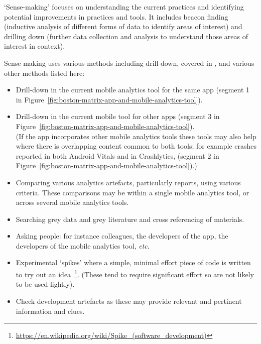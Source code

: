 `Sense-making' focuses on understanding the current practices and identifying potential improvements in practices and tools.  It includes beacon finding (inductive analysis of different forms of data to identify areas of interest) and drilling down (further data collection and analysis to understand those areas of interest in context).

Sense-making uses various methods including drill-down, covered in , and various other methods listed here:

\begin{itemize}
\itemsep0em
    \item Drill-down in the current mobile analytics tool for the same app (segment 1 in Figure~\ref{fig:boston-matrix-app-and-mobile-analytics-tool}).
    \item Drill-down in the current mobile tool for other apps (segment 3 in Figure~\ref{fig:boston-matrix-app-and-mobile-analytics-tool}). \\ (If the app incorporates other mobile analytics tools these tools may also help where there is overlapping content common to both tools; for example crashes reported in both Android Vitals and in Crashlytics, (segment 2 in Figure~\ref{fig:boston-matrix-app-and-mobile-analytics-tool}).)
    \item Comparing various analytics artefacts, particularly reports, using various criteria. These comparisons may be within a single mobile analytics tool, or across several mobile analytics tools.
    \item Searching grey data and grey literature and cross referencing of materials.
    \item Asking people: for instance colleagues, the developers of the app, the developers of the mobile analytics tool, \textit{etc}.
    \item Experimental `spikes' where a simple,  minimal effort piece of code is written to try out an idea~\footnote{\url{https://en.wikipedia.org/wiki/Spike_(software_development)}}. (These tend to require significant effort so are not likely to be used lightly).
    \item Check development artefacts as these may provide relevant and pertinent information and clues.
\end{itemize}

